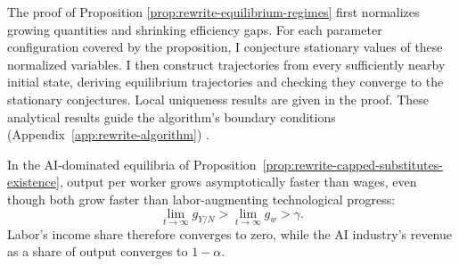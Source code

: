 The proof of Proposition \ref{prop:rewrite-equilibrium-regimes} first normalizes growing quantities and shrinking efficiency gaps. For each parameter configuration covered by the proposition, I conjecture stationary values of these normalized variables. I then construct trajectories from every sufficiently nearby initial state, deriving equilibrium trajectories and checking they converge to the stationary conjectures. %
Local uniqueness results are given in the proof. %
These analytical results guide the algorithm's boundary conditions
(Appendix~\ref{app:rewrite-algorithm})%
.


\begin{remark}
\label{rem:rewrite-ai-revenue-share}
In the AI-dominated equilibria of
Proposition~\ref{prop:rewrite-capped-substitutes-existence}, output per
worker grows asymptotically faster than wages, even though both grow
faster than labor-augmenting technological progress:
\[
 \lim_{t\to\infty}g_{Y/N}>\lim_{t\to\infty}g_w>\gamma.
\]
Labor's income share therefore converges to zero, while the AI industry's revenue as a share of output converges to $1-\alpha$.
\end{remark}

